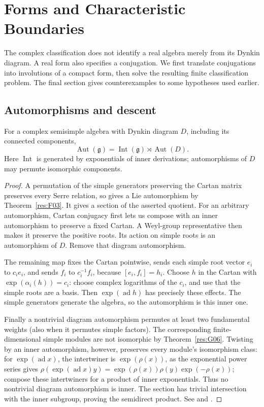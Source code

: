 \chapter{Forms and Characteristic Boundaries}
\label{ch:real-forms}

The complex classification does not identify a real algebra merely from
its Dynkin diagram. A real form also specifies a conjugation. We first
translate conjugations into involutions of a compact form, then solve
the resulting finite classification problem. The final section gives
counterexamples to some hypotheses used earlier.

\section{Automorphisms and descent}

\begin{theorem}\label{res:J01}
For a complex semisimple algebra with Dynkin diagram \(D\), including
its connected components,
\[
 \operatorname{Aut}(\mathfrak g)
 =\operatorname{Int}(\mathfrak g)\rtimes\operatorname{Aut}(D).
\]
Here \(\operatorname{Int}\) is generated by exponentials of inner
derivations; automorphisms of \(D\) may permute isomorphic components.
\end{theorem}
\begin{proof}
A permutation of the simple generators preserving the Cartan matrix
preserves every Serre relation, so gives a Lie automorphism by
Theorem~\ref{res:F03}. It gives a section of the asserted quotient.
For an arbitrary automorphism, Cartan conjugacy first lets us compose
with an inner automorphism to preserve a fixed Cartan. A Weyl-group
representative then makes it preserve the positive roots. Its action
on simple roots is an automorphism of \(D\).
Remove that diagram automorphism.

The remaining map fixes the Cartan pointwise, sends each simple
root vector \(e_i\) to \(c_i e_i\), and sends \(f_i\) to
\(c_i^{-1}f_i\), because \([e_i,f_i]=h_i\).
Choose \(h\) in the Cartan with \(\exp(\alpha_i(h))=c_i\):
choose complex logarithms of the \(c_i\), and use that the
simple roots are a basis. Then \(\exp(\operatorname{ad}h)\)
has precisely these effects. The simple generators generate the
algebra, so the automorphism is this inner one.

Finally a nontrivial diagram automorphism permutes at least two
fundamental weights (also when it permutes simple factors).
The corresponding finite-dimensional simple modules are not
isomorphic by Theorem~\ref{res:G06}. Twisting by an inner
automorphism, however, preserves every module's isomorphism class:
for \(\exp(\operatorname{ad}x)\), the intertwiner is
\(\exp(\rho(x))\), as the exponential power series gives
\(\rho(\exp(\operatorname{ad}x)y)
=\exp(\rho(x))\rho(y)\exp(-\rho(x))\);
compose these intertwiners for a product of inner exponentials.
Thus no nontrivial diagram automorphism is inner. The section
has trivial intersection with the inner subgroup, proving the
semidirect product.
See \cite[Section 14.3]{humphreys} and
\cite[Proposition 40.3]{etingof}.
\end{proof}

